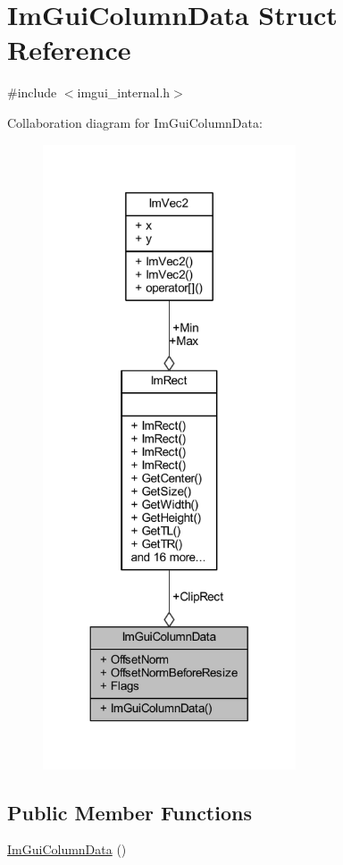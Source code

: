 \hypertarget{struct_im_gui_column_data}{}\section{Im\+Gui\+Column\+Data Struct Reference}
\label{struct_im_gui_column_data}


{\ttfamily \#include $<$imgui\+\_\+internal.\+h$>$}



Collaboration diagram for Im\+Gui\+Column\+Data\+:
\nopagebreak
\begin{figure}[H]
\begin{center}
\leavevmode
\includegraphics[width=212pt]{struct_im_gui_column_data__coll__graph}
\end{center}
\end{figure}
\subsection*{Public Member Functions}
\begin{DoxyCompactItemize}
\item 
\mbox{\hyperlink{struct_im_gui_column_data_a296c9275c6e711dfd63ac0a3c1bb8c99}{Im\+Gui\+Column\+Data}} ()
\end{DoxyCompactItemize}
